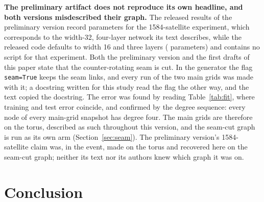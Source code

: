 \documentclass[preprint,11pt,3p]{elsarticle}
\begin{document}
\textbf{The preliminary artifact does not reproduce its own headline, and both versions
misdescribed their graph.} The released results of the preliminary version record
\numPrelimParams{} parameters for the 1584-satellite experiment, which corresponds to the
width-32, four-layer network its text describes, while the released code defaults to width 16
and three layers (\numReleasedParams{} parameters) and contains no script for that experiment.
Both the preliminary version and the first drafts of this paper state that the counter-rotating
seam is cut. In the generator the flag \texttt{seam=True} keeps the seam links, and every run of
the two main grids was made with it; a docstring written for this study read the flag the other
way, and the text copied the docstring. The error was found by reading Table~\ref{tab:fit}, where
training and test error coincide, and confirmed by the degree sequence: every node of every
main-grid snapshot has degree four. The main grids are therefore on the torus, described as such
throughout this version, and the seam-cut graph is run as its own arm
(Section~\ref{sec:seam}). The preliminary version's 1584-satellite claim was, in the event, made on
the torus and recovered here on the seam-cut graph; neither its text nor its authors knew which
graph it was on.

\section{Conclusion}
\label{sec:conclusion}
\end{document}
